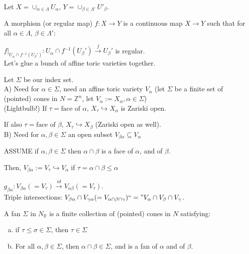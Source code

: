 \documentclass[a4paper,12pt]{amsart}
\newcommand{\R}{\ensuremath{\mathbb{R}}}
\newcommand{\Z}{\ensuremath{\mathbb{Z}}}
\newcommand{\iv}{\ensuremath{^{-1}}}
\begin{document}
Let $X=\cup_{\alpha\in \Lambda}U_\alpha$, $Y=\cup_{\beta \in \Lambda'}U'_\beta$.

A morphism (or regular map) $f:X\to Y$ is a continuous map $X\to Y$ such that for all $\alpha \in \Lambda$, $\beta \in \Lambda'$:

$f|_{U_\alpha\cap f\iv(U_\beta')}:U_\alpha\cap f\iv(U_\beta')\xrightarrow{f}U_\beta'$ is regular.
\\

Let's glue a bunch of affine toric varieties together. 

Let $\Sigma$ be our index set.
\\

A) Need for $\alpha \in \Sigma$, need an affine toric variety $V_\alpha$ (let $\Sigma$ be a finite set of (pointed) cones in $N=\Z^n$, let $V_\alpha := X_\alpha, \alpha \in \Sigma$)
\\

(Lightbulb!) If $\tau=\text{face of } \alpha$, $X_\tau\hookrightarrow X_\alpha$ is Zariski open.

If also $\tau=\text{face of }\beta $, $X_\tau \hookrightarrow X_\beta$ (Zariski open as well).
\\

B) Need for $\alpha, \beta \in \Sigma$ an open subset $V_{\beta\alpha}\subseteq V_\alpha$

ASSUME if $\alpha,\beta \in \Sigma$ then $\alpha \cap \beta$ is a face of $\alpha$, and of $\beta$.

Then, $V_{\beta\alpha}:= V_\tau \hookrightarrow V_\alpha$ if $\tau = \alpha\cap \beta \leq \alpha$

$g_{\beta\alpha}:V_{\beta\alpha}(=V_\tau)\xrightarrow{id}V_{\alpha\beta}(=V_\tau)$.
\\

Triple intersections:
$V_{\beta\alpha}\cap V_{\gamma\alpha}(=V_{\alpha\cap\beta\cap \gamma})``=" V_\alpha\cap V_\beta\cap V_\gamma$.
\\

\begin{Def}[Version 0.1]
	A fan $\Sigma$ in $N_\R$ is a finite collection of (pointed) cones in $N$ satisfying:
	\begin{enumerate}[a)]
		\item if $\tau\leq \sigma\in \Sigma$, then $\tau\in \Sigma$
		\item For all $\alpha, \beta \in \Sigma$, then $\alpha\cap \beta\in\Sigma$, and is a fan of $\alpha$ and of $\beta$.
	\end{enumerate}
\end{Def}
\end{document}
